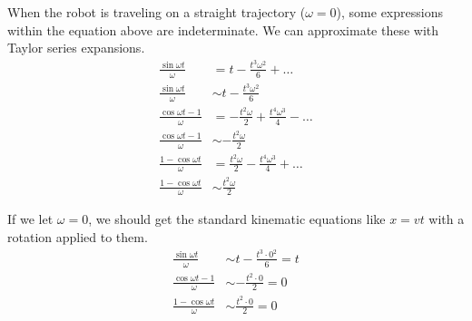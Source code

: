 When the robot is traveling on a straight trajectory ($\omega = 0$), some
expressions within the equation above are indeterminate. We can approximate
these with Taylor series expansions.
\begin{align*}
  \frac{\sin\omega t}{\omega} &= t - \frac{t^3 \omega^2}{6} + \ldots \\
  \frac{\sin\omega t}{\omega} &\sim t - \frac{t^3 \omega^2}{6} \\
  \frac{\cos\omega t - 1}{\omega} &= -\frac{t^2 \omega}{2} + \frac{t^4 \omega^3}{4} - \ldots \\
  \frac{\cos\omega t - 1}{\omega} &\sim -\frac{t^2 \omega}{2} \\
  \frac{1 - \cos\omega t}{\omega} &= \frac{t^2 \omega}{2} - \frac{t^4 \omega^3}{4} + \ldots \\
  \frac{1 - \cos\omega t}{\omega} &\sim \frac{t^2 \omega}{2}
\end{align*}

If we let $\omega = 0$, we should get the standard kinematic equations like
$x = vt$ with a rotation applied to them.
\begin{align*}
  \frac{\sin\omega t}{\omega} &\sim t - \frac{t^3 \cdot 0^2}{6} = t \\
  \frac{\cos\omega t - 1}{\omega} &\sim -\frac{t^2 \cdot 0}{2} = 0 \\
  \frac{1 - \cos\omega t}{\omega} &\sim \frac{t^2 \cdot 0}{2} = 0
\end{align*}

